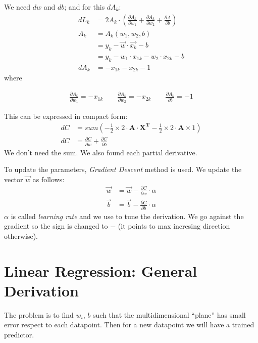 We need $dw$ and $db$; and for this $dA_k$:
\begin{align*}
  dL_k  &= 2A_k\cdot{}(\frac{\partial A_k}{\partial w_1} + \frac{\partial A_k}{\partial w_2} + \frac{\partial A}{\partial b}) \\
  A_k &= A_k(w_1, w_2, b)\\
  &= y_k - \vec{w}\cdot{}\vec{x_k} - b\\
  &= y_k - w_1\cdot{}x_{1k} - w_2\cdot{}x_{2k}-b\\
  dA_k &= -x_{1k} - x_{2k} -1
\end{align*}
where 
\begin{center}
\begin{align*}
  \frac{\partial A_{k}}{\partial w_1} = -x_{1k}\hspace{2em} \frac{\partial A_{k}}{\partial w_2} = -x_{2k}\hspace{2em} \frac{\partial A_k}{\partial b} = -1
\end{align*} 
\end{center}

This can be expressed in compact form:
\begin{align}
  dC &= sum(-\frac{1}{2}\times{}2\cdot{}\mathbf{A}\cdot{}\mathbf{X^T} -\frac{1}{2}\times{}2\cdot{}\mathbf{A}\times{}1)\\
  dC &= \frac{\partial C}{\partial w} + \frac{\partial C}{\partial b}  \nonumber
\end{align}
We don't need the sum. We also found each partial derivative.

To update the parameters, \textit{Gradient Descent} method is used. We update the vector $\vec{w}$ as follows:
\begin{align}
  \vec{w} &= \vec{w} -\frac{\partial C}{\partial w}\cdot{}\alpha\\
  \vec{b} &= \vec{b} -\frac{\partial C}{\partial b}\cdot{}\alpha
\end{align}
$\alpha$ is called \textit{learning rate} and we use to tune the derivation. We go against the gradient so the sign is changed to $-$ (it points to max incresing direction otherwise).







\section{Linear Regression: General Derivation}
The problem is to find $w_i$, $b$ such that the multidimensional ``plane'' has small error respect to each datapoint. Then for a new datapoint we will have a trained predictor.

